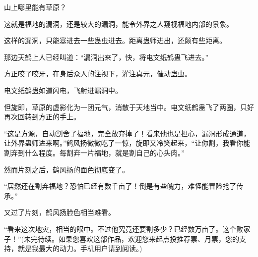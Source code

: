 \begin{this_body}
山上哪里能有草原？

这就是福地的漏洞，还是较大的漏洞，能令外界之人窥视福地内部的景象。

这样的漏洞，只能塞进去一些蛊虫进去。距离蛊师进出，还颇有些距离。

那边天鹤上人已经叫道：“漏洞出来了，快，将电文纸鹤蛊飞进去。”

方正咬了咬牙，在身后众人的注视下，灌注真元，催动蛊虫。

电文纸鹤蛊如道闪电，飞射进漏洞中。

但旋即，草原的虚影化为一团元气，消散于天地当中。电文纸鹤蛊飞了两圈，只好再次回转到方正的手上。

“这是方源，自动割舍了福地，完全放弃掉了！看来他也是担心，漏洞形成通道，让外界蛊师进来啊。”鹤风扬微微吃了一惊，旋即又冷笑起来，“让你割，我看你能割弃到什么程度。每割弃一片福地，就是割自己的心头肉。”

然而片刻之后，鹤风扬的面色彻底变了。

“居然还在割弃福地？恐怕已经有数千亩了！倒是有些魄力，难怪能冒险抢了传承。”

又过了片刻，鹤风扬脸色相当难看。

“看来这次地灾，相当的眼中。不过他究竟还要割多少？已经数万亩了。这个败家子！”(未完待续。如果您喜欢这部作品，欢迎您来起点投推荐票、月票，您的支持，就是我最大的动力。手机用户请到阅读。)

\end{this_body}

